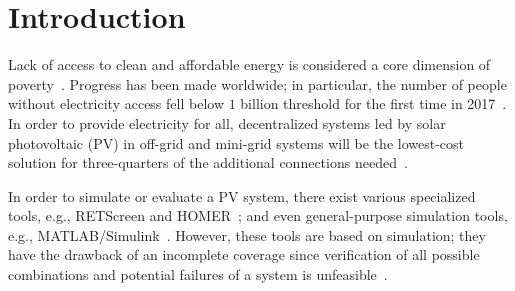 \documentclass[runningheads]{llncs}
\begin{document}
\section{Introduction}

Lack of access to clean and affordable energy is considered a core dimension of poverty~\cite{Hussein2012}. Progress has been made worldwide; in particular, the number of people without electricity access fell below $1$ billion threshold for the first time in 2017~\cite{IEAweo2018}. In order to provide electricity for all, decentralized systems led by solar photovoltaic (PV) in off-grid and mini-grid systems will be the lowest-cost solution for three-quarters of the additional connections needed~\cite{Hussein2012}. 

In order to simulate or evaluate a PV system, there exist various specialized tools, e.g., RETScreen and HOMER~\cite{Pradhan,Swarnkar}; and even general-purpose simulation tools, e.g., MATLAB/Simulink~\cite{Gow1999}. 
 However, these tools are based on simulation; they have the drawback of an incomplete coverage since verification of all possible combinations and potential failures of a system is unfeasible~\cite{ClarkeHV18}. 
\end{document}
